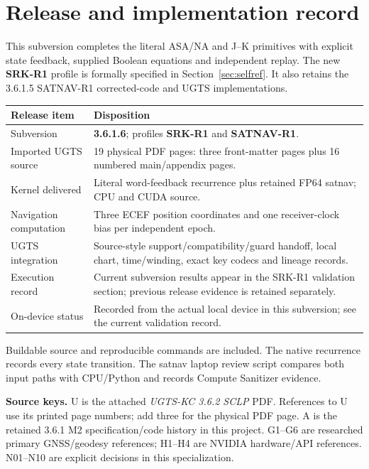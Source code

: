 \documentclass[11pt,a4paper]{article}
\begin{document}
\section*{Release and implementation record}
This subversion completes the literal ASA/NA and J--K primitives with explicit
state feedback, supplied Boolean equations and independent replay. The new
\textbf{SRK-R1} profile is formally specified in Section~\ref{sec:selfref}.
It also retains the 3.6.1.5 SATNAV-R1 corrected-code and UGTS implementations.

\begin{center}
\begin{tabularx}{\textwidth}{@{}P{.30\textwidth}Y@{}}\toprule
\textbf{Release item} & \textbf{Disposition}\\\midrule
Subversion & \textbf{3.6.1.6}; profiles \textbf{SRK-R1} and \textbf{SATNAV-R1}.\\
Imported UGTS source & 19 physical PDF pages: three front-matter pages plus 16 numbered main/appendix pages.\\
Kernel delivered & Literal word-feedback recurrence plus retained FP64 satnav; CPU and CUDA source.\\
Navigation computation & Three ECEF position coordinates and one receiver-clock bias per independent epoch.\\
UGTS integration & Source-style support/compatibility/guard handoff, local chart, time/winding, exact key codecs and lineage records.\\
Execution record & Current subversion results appear in the SRK-R1 validation section; previous release evidence is retained separately.\\
On-device status & Recorded from the actual local device in this subversion; see the current validation record.\\\bottomrule
\end{tabularx}
\end{center}

Buildable source and reproducible commands are included. The native recurrence
records every state transition. The satnav laptop review script compares both
input paths with CPU/Python and records Compute Sanitizer evidence.

\textbf{Source keys.} U is the attached \emph{UGTS-KC 3.6.2 SCLP} PDF. References to U
use its printed page numbers; add three for the physical PDF page. A is the retained
3.6.1 M2 specification/code history in this project. G1--G6 are researched primary
GNSS/geodesy references; H1--H4 are NVIDIA hardware/API references. N01--N10 are
explicit decisions in this specialization.
\end{document}
